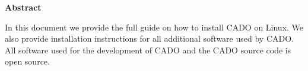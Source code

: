 
\clearemptydoublepage
{}
{}	





\vspace*{2cm}
\begin{center}
{\Large \bf Abstract}
\end{center}
\vspace{1cm}
In this document we provide the full guide on how to install CADO on Linux. We also provide installation instructions for all additional software used by CADO. All software used for the development of CADO and the CADO source code is open source.
